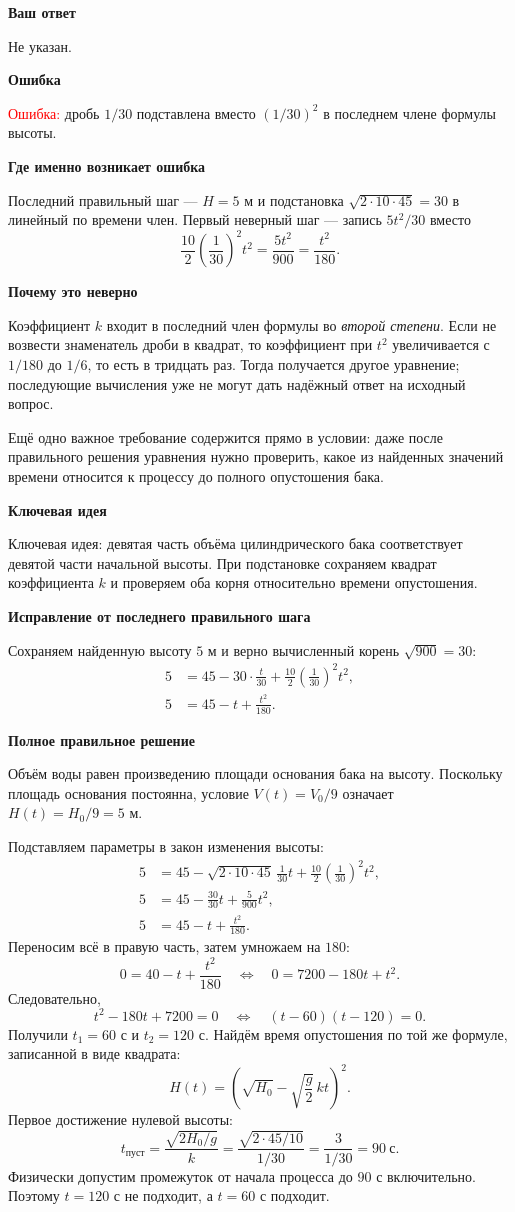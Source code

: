 \documentclass[12pt,a4paper]{article}
\newcommand{\reviewline}[1]{\par\medskip\textbf{#1}\par\smallskip}
\begin{document}
\reviewline{Ваш ответ}
Не указан.

\reviewline{Ошибка}
\textcolor{red}{Ошибка:} дробь $1/30$ подставлена вместо $(1/30)^2$ в последнем члене формулы высоты.

\reviewline{Где именно возникает ошибка}
Последний правильный шаг --- $H=5$ м и подстановка $\sqrt{2\cdot10\cdot45}=30$ в линейный по времени член. Первый неверный шаг --- запись $5t^2/30$ вместо
\[
\frac{10}{2}\left(\frac1{30}\right)^2t^2
=\frac{5t^2}{900}=\frac{t^2}{180}.
\]

\reviewline{Почему это неверно}
Коэффициент $k$ входит в последний член формулы во \emph{второй степени}. Если не возвести знаменатель дроби в квадрат, то коэффициент при $t^2$ увеличивается с $1/180$ до $1/6$, то есть в тридцать раз. Тогда получается другое уравнение; последующие вычисления уже не могут дать надёжный ответ на исходный вопрос.

Ещё одно важное требование содержится прямо в условии: даже после правильного решения уравнения нужно проверить, какое из найденных значений времени относится к процессу до полного опустошения бака.

\reviewline{Ключевая идея}
\textcolor{blue!60!black}{Ключевая идея:} девятая часть объёма цилиндрического бака соответствует девятой части начальной высоты. При подстановке сохраняем квадрат коэффициента $k$ и проверяем оба корня относительно времени опустошения.

\reviewline{Исправление от последнего правильного шага}
Сохраняем найденную высоту $5$ м и верно вычисленный корень $\sqrt{900}=30$:
\[
\begin{aligned}
5&=45-30\cdot\frac t{30}
  +\frac{10}{2}\left(\frac1{30}\right)^2t^2,\\
5&=45-t+\frac{t^2}{180}.
\end{aligned}
\]

\reviewline{Полное правильное решение}
Объём воды равен произведению площади основания бака на высоту. Поскольку площадь основания постоянна, условие $V(t)=V_0/9$ означает $H(t)=H_0/9=5$ м.

Подставляем параметры в закон изменения высоты:
\[
\begin{aligned}
5&=45-\sqrt{2\cdot10\cdot45}\,\frac1{30}t
       +\frac{10}{2}\left(\frac1{30}\right)^2t^2,\\
5&=45-\frac{30}{30}t+\frac{5}{900}t^2,\\
5&=45-t+\frac{t^2}{180}.
\end{aligned}
\]
Переносим всё в правую часть, затем умножаем на $180$:
\[
0=40-t+\frac{t^2}{180}
\quad\Longleftrightarrow\quad
0=7200-180t+t^2.
\]
Следовательно,
\[
t^2-180t+7200=0
\quad\Longleftrightarrow\quad
(t-60)(t-120)=0.
\]
Получили $t_1=60$ с и $t_2=120$ с. Найдём время опустошения по той же формуле, записанной в виде квадрата:
\[
H(t)=\left(\sqrt{H_0}-\sqrt{\frac g2}\,kt\right)^2.
\]
Первое достижение нулевой высоты:
\[
t_{\text{пуст}}=\frac{\sqrt{2H_0/g}}{k}
=\frac{\sqrt{2\cdot45/10}}{1/30}
=\frac3{1/30}=90\ \text{с}.
\]
Физически допустим промежуток от начала процесса до $90$ с включительно. Поэтому $t=120$ с не подходит, а $t=60$ с подходит.
\end{document}
